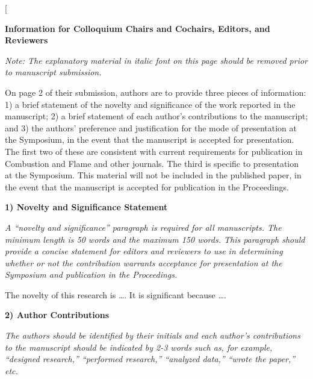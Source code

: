 \documentclass[twocolumn,10pt]{article} %
\begin{document}
\twocolumn[\begin{@twocolumnfalse}

\centerline{\bf Information for Colloquium Chairs and Cochairs, Editors, and Reviewers}

\vspace{20pt}

{\em
Note: The explanatory material in italic font on this page should be removed prior to manuscript submission.
\vspace{10pt}

On page 2 of their submission, authors are to provide three pieces of information:
1) a brief statement of the novelty and significance of the work reported in the manuscript;
2) a brief statement of each author's contributions to the manuscript;
and 3) the authors' preference and justification for the mode of presentation at the Symposium, in the event that the manuscript is accepted for presentation. The first two of these are consistent with current requirements for publication in Combustion and Flame and other journals. The third is specific to presentation at the Symposium. This material will not be included in the published paper, in the event that the manuscript is accepted for publication in the Proceedings.
}

\vspace{20pt}

{\bf 1) Novelty and Significance Statement}
\vspace{10pt}

{\em
A ``novelty and significance'' paragraph is required for all manuscripts. The minimum length is 50 words and the maximum 150 words. This paragraph should provide a concise statement for editors and reviewers to use in determining whether or not the contribution warrants acceptance for presentation at the Symposium and publication in the Proceedings.
}

\vspace{10pt}

The novelty of this research is \ldots. It is significant because \ldots.

\vspace{20pt} 

{\bf 2) Author Contributions}
\vspace{10pt}

{\em
The authors should be identified by their initials and each author's contributions to the manuscript should be indicated by 2-3 words such as, for example, ``designed research,'' ``performed research,'' ``analyzed data,'' ``wrote the paper,'' etc.
}


\end{@twocolumnfalse}
\end{document}
